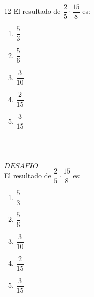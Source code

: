 \documentclass[12pt]{article}
\begin{document}
\begin{enumerate}
	\begin{enumerate}
		\item [12]El resultado de $\dfrac{2}{5} \cdot \dfrac{15}{8}$	es:
		\begin{enumerate}
			\item $\dfrac{5}{3}$\\
			\item $\dfrac{5}{6}$\\
			\item $\dfrac{3}{10}$\\
			\item $\dfrac{2}{15}$\\
			\item $\dfrac{3}{15}$\\
		\end{enumerate}
	\end{enumerate}
\ \\ \ \\
 \begin{enumerate}
 	\item [$DESAFIO$]\\
 	El resultado de $\dfrac{2}{5} \cdot \dfrac{15}{8}$	es:
 	\begin{enumerate}
 		\item $\dfrac{5}{3}$\\
 		\item $\dfrac{5}{6}$\\
 		\item $\dfrac{3}{10}$\\
 		\item $\dfrac{2}{15}$\\
 		\item $\dfrac{3}{15}$\\
 	\end{enumerate}
 \end{enumerate}
\end{enumerate}
\end{document}
